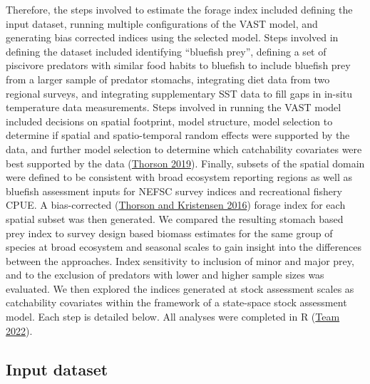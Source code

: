 \documentclass[
]{article}
\begin{document}
Therefore, the steps involved to estimate the forage index included defining the input dataset, running multiple configurations of the VAST model, and generating bias corrected indices using the selected model. Steps involved in defining the dataset included identifying ``bluefish prey'', defining a set of piscivore predators with similar food habits to bluefish to include bluefish prey from a larger sample of predator stomachs, integrating diet data from two regional surveys, and integrating supplementary SST data to fill gaps in in-situ temperature data measurements. Steps involved in running the VAST model included decisions on spatial footprint, model structure, model selection to determine if spatial and spatio-temporal random effects were supported by the data, and further model selection to determine which catchability covariates were best supported by the data (\protect\hyperlink{ref-thorson_guidance_2019}{Thorson 2019}). Finally, subsets of the spatial domain were defined to be consistent with broad ecosystem reporting regions as well as bluefish assessment inputs for NEFSC survey indices and recreational fishery CPUE. A bias-corrected (\protect\hyperlink{ref-thorson_implementing_2016}{Thorson and Kristensen 2016}) forage index for each spatial subset was then generated. We compared the resulting stomach based prey index to survey design based biomass estimates for the same group of species at broad ecosystem and seasonal scales to gain insight into the differences between the approaches. Index sensitivity to inclusion of minor and major prey, and to the exclusion of predators with lower and higher sample sizes was evaluated. We then explored the indices generated at stock assessment scales as catchability covariates within the framework of a state-space stock assessment model. Each step is detailed below. All analyses were completed in R (\protect\hyperlink{ref-r_core_team_r_2022}{Team 2022}).

\hypertarget{input-dataset}{%
\subsection{Input dataset}\label{input-dataset}}
\end{document}
